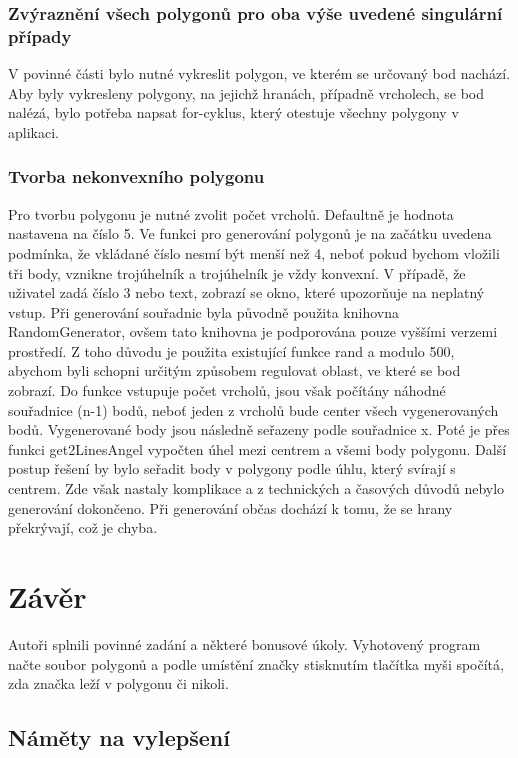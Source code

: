 \documentclass[a4paper, 12pt]{article}
\begin{document}
\subsubsection{Zvýraznění všech polygonů pro oba výše uvedené singulární případy}
V povinné části bylo nutné vykreslit polygon, ve kterém se určovaný bod nachází. Aby byly vykresleny polygony, na jejichž hranách, případně vrcholech, se bod nalézá, bylo potřeba napsat for-cyklus, který otestuje všechny polygony v aplikaci.


\subsubsection{Tvorba nekonvexního polygonu}
Pro tvorbu polygonu je nutné zvolit počet vrcholů. Defaultně je hodnota nastavena na číslo 5. Ve funkci pro generování polygonů je na začátku uvedena podmínka, že vkládané číslo nesmí být menší než 4, neboť pokud bychom vložili tři body, vznikne trojúhelník a trojúhelník je vždy konvexní. V případě, že uživatel zadá číslo 3 nebo text, zobrazí se okno, které upozorňuje na neplatný vstup. Při generování souřadnic byla původně použita knihovna RandomGenerator, ovšem tato knihovna je podporována pouze vyššími verzemi prostředí. Z toho důvodu je použita existující funkce rand a modulo 500, abychom byli schopni určitým způsobem regulovat oblast, ve které se bod zobrazí. Do funkce vstupuje počet vrcholů, jsou však počítány náhodné souřadnice (n-1) bodů, neboť jeden z vrcholů bude center všech vygenerovaných bodů. Vygenerované body jsou následně seřazeny podle souřadnice x. Poté je přes funkci get2LinesAngel vypočten úhel mezi centrem a všemi body polygonu. Další postup řešení by bylo seřadit body v polygony podle úhlu, který svírají s centrem. Zde však nastaly komplikace a z technických a časových důvodů nebylo generování dokončeno. Při generování občas dochází k tomu, že se hrany překrývají, což je chyba. 

 
\clearpage
\section{Závěr}
Autoři splnili povinné zadání a některé bonusové úkoly. Vyhotovený program načte soubor polygonů a podle umístění značky stisknutím tlačítka myši spočítá, zda značka leží v polygonu či nikoli.

\subsection{Náměty na vylepšení}
\end{document}
